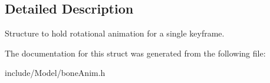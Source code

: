 \subsection{Detailed Description}
Structure to hold rotational animation for a single keyframe. 

The documentation for this struct was generated from the following file\+:\begin{DoxyCompactItemize}
\item 
include/\+Model/bone\+Anim.\+h\end{DoxyCompactItemize}
